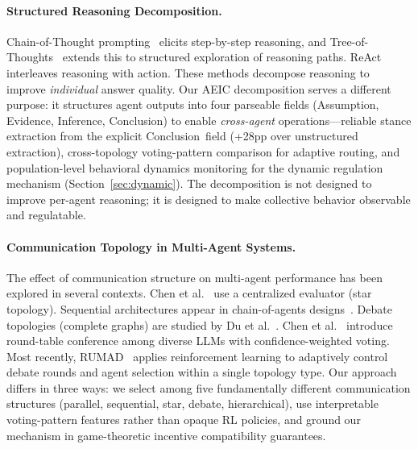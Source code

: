 \paragraph{Structured Reasoning Decomposition.}
Chain-of-Thought prompting~\cite{wei2022chain} elicits step-by-step reasoning, and Tree-of-Thoughts~\cite{yao2024tree} extends this to structured exploration of reasoning paths. ReAct~\cite{yao2023react} interleaves reasoning with action. These methods decompose reasoning to improve \emph{individual} answer quality. Our AEIC decomposition serves a different purpose: it structures agent outputs into four parseable fields (Assumption, Evidence, Inference, Conclusion) to enable \emph{cross-agent} operations---reliable stance extraction from the explicit Conclusion~field (+28pp over unstructured extraction), cross-topology voting-pattern comparison for adaptive routing, and population-level behavioral dynamics monitoring for the dynamic regulation mechanism (Section~\ref{sec:dynamic}). The decomposition is not designed to improve per-agent reasoning; it is designed to make collective behavior observable and regulatable.

\paragraph{Communication Topology in Multi-Agent Systems.}
The effect of communication structure on multi-agent performance has been explored in several contexts. Chen et al.~\cite{chen2023agentverse} use a centralized evaluator (star topology). Sequential architectures appear in chain-of-agents designs~\cite{hong2023metagpt}. Debate topologies (complete graphs) are studied by Du et al.~\cite{du2024improving}. Chen et al.~\cite{chen2024reconcile} introduce round-table conference among diverse LLMs with confidence-weighted voting. Most recently, RUMAD~\cite{wang2026rumad} applies reinforcement learning to adaptively control debate rounds and agent selection within a single topology type. Our approach differs in three ways: we select among five fundamentally different communication structures (parallel, sequential, star, debate, hierarchical), use interpretable voting-pattern features rather than opaque RL policies, and ground our mechanism in game-theoretic incentive compatibility guarantees.

